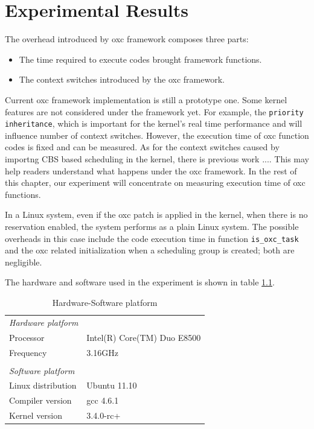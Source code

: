 \chapter{Experimental Results\label{chap:exp}}
The overhead introduced by oxc framework composes three parts:
\begin{itemize}
\item The time required to execute codes brought framework functions.
\item The context switches introduced by the oxc framework.
\end{itemize}

Current oxc framework implementation is still a prototype one. Some kernel 
features are not considered under the framework yet. For example, the 
\texttt{priority inheritance}, which is important for the kernel's real time
performance and will influence number of context switches. 
However, the execution time of oxc function codes is fixed and can be measured.
As for the context switches caused by importng CBS based scheduling in the
kernel, there is previous work .... This may help readers understand what 
happens under the oxc framework. In the rest of this chapter, our experiment
will concentrate on measuring execution time of oxc functions.

In a Linux system, even if the oxc patch is applied in the kernel, when there 
is no reservation enabled, the system performs as a plain Linux system. 
The possible overheads in this case include the code execution time in 
function \texttt{is\_oxc\_task} and the oxc related initialization when a 
scheduling group is created; both are negligible.

The hardware and software used in the experiment is shown in 
table \ref{tab:exp_setup}.
\begin{table}[thbp]
  \centering
  \begin{tabular}{ll}\hline
	\emph{Hardware platform}\hspace{4cm}		& 	\\
	Processor			& Intel(R) Core(TM) Duo E8500	 \\
	Frequency			& 3.16GHz\\
					&	\\	
	\emph{Software platform}\hspace{4cm}		& 	\\
	Linux distribution		& Ubuntu 11.10\\
	Compiler version		& gcc 4.6.1\\
	Kernel version			& 3.4.0-rc+ \\\hline
  \end{tabular}
  \caption{Hardware-Software platform}
  \label{tab:exp_setup}
\end{table}
